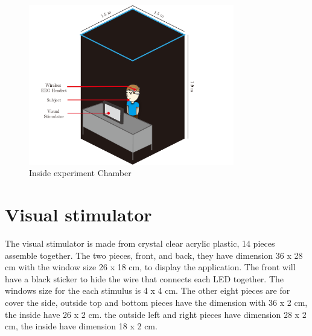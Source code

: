 \begin{figure}[ht]
	\centering
	\includegraphics[width=0.8\textwidth]{chapter6/dark_wire_inside.pdf}
	\caption{Inside experiment Chamber}
\end{figure}
\section{Visual stimulator}

\hspace{1.5cm}The visual stimulator is made from crystal clear acrylic plastic, 14 pieces assemble together. The two pieces, front, and back, they have dimension 36 x 28 cm with the window size 26 x 18 cm, to display the application. The front will have a black sticker to hide the wire that connects each LED together. The windows size for the each stimulus is 4 x 4 cm. The other eight pieces are for cover the side, outside top and bottom pieces have the dimension with 36 x 2 cm, the inside have 26 x 2 cm. the outside left and right pieces have dimension 28 x 2 cm, the inside have dimension 18 x 2  cm.\\

